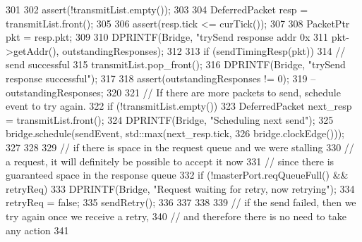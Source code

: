 \begin{DoxyCode}
301 {
302     assert(!transmitList.empty());
303 
304     DeferredPacket resp = transmitList.front();
305 
306     assert(resp.tick <= curTick());
307 
308     PacketPtr pkt = resp.pkt;
309 
310     DPRINTF(Bridge, "trySend response addr 0x%
311             pkt->getAddr(), outstandingResponses);
312 
313     if (sendTimingResp(pkt)) {
314         // send successful
315         transmitList.pop_front();
316         DPRINTF(Bridge, "trySend response successful\n");
317 
318         assert(outstandingResponses != 0);
319         --outstandingResponses;
320 
321         // If there are more packets to send, schedule event to try again.
322         if (!transmitList.empty()) {
323             DeferredPacket next_resp = transmitList.front();
324             DPRINTF(Bridge, "Scheduling next send\n");
325             bridge.schedule(sendEvent, std::max(next_resp.tick,
326                                                 bridge.clockEdge()));
327         }
328 
329         // if there is space in the request queue and we were stalling
330         // a request, it will definitely be possible to accept it now
331         // since there is guaranteed space in the response queue
332         if (!masterPort.reqQueueFull() && retryReq) {
333             DPRINTF(Bridge, "Request waiting for retry, now retrying\n");
334             retryReq = false;
335             sendRetry();
336         }
337     }
338 
339     // if the send failed, then we try again once we receive a retry,
340     // and therefore there is no need to take any action
341 }
\end{DoxyCode}


